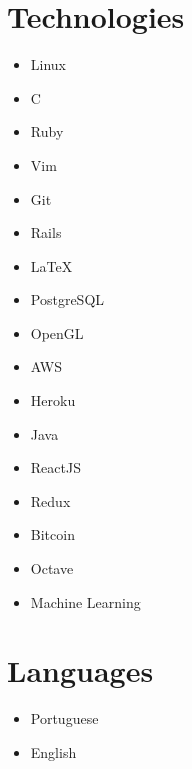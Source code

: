 \documentclass[a4paper]{simplecv}
\begin{document}
\section{Technologies}

\begin{multicols}{4}
	\raggedcolumns
	\begin{itemize}
		\item Linux
		\item C
		\item Ruby
		\item Vim
		\item Git
		\item Rails
		\item \LaTeX{}
		\item PostgreSQL
		\item OpenGL
		\item AWS
		\item Heroku
		\item Java
		\item ReactJS
		\item Redux
		\item Bitcoin
		\item Octave
		\item Machine Learning
	\end{itemize}
\end{multicols}

\section{Languages}

\begin{multicols}{4}
	\raggedcolumns
	\begin{itemize}
		\item Portuguese
		\item English
	\end{itemize}
\end{multicols}

%
\end{document}
